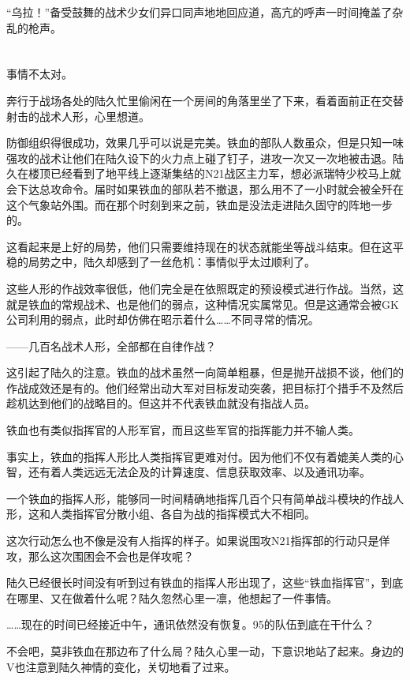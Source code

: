 “乌拉！”备受鼓舞的战术少女们异口同声地地回应道，高亢的呼声一时间掩盖了杂乱的枪声。

\section*{}

事情不太对。

奔行于战场各处的陆久忙里偷闲在一个房间的角落里坐了下来，看着面前正在交替射击的战术人形，心里想道。

防御组织得很成功，效果几乎可以说是完美。铁血的部队人数虽众，但是只知一味强攻的战术让他们在陆久设下的火力点上碰了钉子，进攻一次又一次地被击退。陆久在楼顶已经看到了地平线上逐渐集结的N21战区主力军，想必派瑞特少校马上就会下达总攻命令。届时如果铁血的部队若不撤退，那么用不了一小时就会被全歼在这个气象站外围。而在那个时刻到来之前，铁血是没法走进陆久固守的阵地一步的。

这看起来是上好的局势，他们只需要维持现在的状态就能坐等战斗结束。但在这平稳的局势之中，陆久却感到了一丝危机：事情似乎太过顺利了。

这些人形的作战效率很低，他们完全是在依照既定的预设模式进行作战。当然，这就是铁血的常规战术、也是他们的弱点，这种情况实属常见。但是这通常会被GK公司利用的弱点，此时却仿佛在昭示着什么……不同寻常的情况。

——几百名战术人形，全部都在自律作战？

这引起了陆久的注意。铁血的战术虽然一向简单粗暴，但是抛开战损不谈，他们的作战成效还是有的。他们经常出动大军对目标发动突袭，把目标打个措手不及然后趁机达到他们的战略目的。但这并不代表铁血就没有指战人员。

铁血也有类似指挥官的人形军官，而且这些军官的指挥能力并不输人类。

事实上，铁血的指挥人形比人类指挥官更难对付。因为他们不仅有着媲美人类的心智，还有着人类远远无法企及的计算速度、信息获取效率、以及通讯功率。

一个铁血的指挥人形，能够同一时间精确地指挥几百个只有简单战斗模块的作战人形，这和人类指挥官分散小组、各自为战的指挥模式大不相同。

这次行动怎么也不像是没有人指挥的样子。如果说围攻N21指挥部的行动只是佯攻，那么这次围困会不会也是佯攻呢？

陆久已经很长时间没有听到过有铁血的指挥人形出现了，这些“铁血指挥官”，到底在哪里、又在做着什么呢？陆久忽然心里一凛，他想起了一件事情。

……现在的时间已经接近中午，通讯依然没有恢复。95的队伍到底在干什么？

不会吧，莫非铁血在那边布了什么局？陆久心里一动，下意识地站了起来。身边的V也注意到陆久神情的变化，关切地看了过来。

